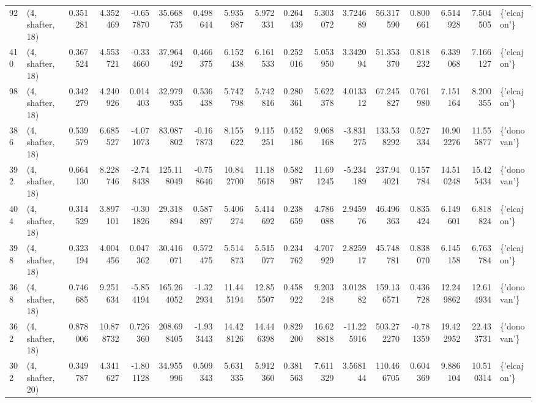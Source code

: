 \begin{tabular}{llrrrrrrrrrrrrrrl}
92  &  (4, shafter, 18) &   0.351281 &   4.352469 &  -0.657870 &    35.668735 &   0.498644 &   5.935987 &   5.972331 &  0.264439 &   5.303072 &   3.724689 &    56.317590 &   0.800661 &   6.514928 &   7.504505 &  \{'elcajon'\} \\
410 &  (4, shafter, 18) &   0.367524 &   4.553721 &  -0.334660 &    37.964492 &   0.466375 &   6.152438 &   6.161533 &  0.252016 &   5.053950 &   3.342094 &    51.353370 &   0.818232 &   6.339068 &   7.166127 &  \{'elcajon'\} \\
98  &  (4, shafter, 18) &   0.342279 &   4.240926 &   0.014403 &    32.979935 &   0.536438 &   5.742798 &   5.742816 &  0.280361 &   5.622378 &   4.013312 &    67.245827 &   0.761980 &   7.151164 &   8.200355 &  \{'elcajon'\} \\
386 &  (4, shafter, 18) &   0.539579 &   6.685527 &  -4.071073 &    83.087802 &  -0.167873 &   8.155622 &   9.115251 &  0.452186 &   9.068168 &  -3.831275 &   133.538292 &   0.527334 &  10.902276 &  11.555877 &  \{'donovan'\} \\
392 &  (4, shafter, 18) &   0.664130 &   8.228746 &  -2.748438 &   125.118049 &  -0.758646 &  10.842700 &  11.185618 &  0.582987 &  11.691245 &  -5.234189 &   237.944021 &   0.157784 &  14.510248 &  15.425434 &  \{'donovan'\} \\
404 &  (4, shafter, 18) &   0.314529 &   3.897101 &  -0.301826 &    29.318894 &   0.587897 &   5.406274 &   5.414692 &  0.238659 &   4.786088 &   2.945976 &    46.496363 &   0.835424 &   6.149601 &   6.818824 &  \{'elcajon'\} \\
398 &  (4, shafter, 18) &   0.323194 &   4.004456 &   0.047362 &    30.416071 &   0.572475 &   5.514873 &   5.515077 &  0.234762 &   4.707929 &   2.825917 &    45.748781 &   0.838070 &   6.145158 &   6.763784 &  \{'elcajon'\} \\
368 &  (4, shafter, 18) &   0.746685 &   9.251634 &  -5.854194 &   165.264052 &  -1.322934 &  11.445194 &  12.855507 &  0.458922 &   9.203248 &   3.012882 &   159.136571 &   0.436728 &  12.249862 &  12.614934 &  \{'donovan'\} \\
362 &  (4, shafter, 18) &   0.878006 &  10.878732 &   0.726360 &   208.698405 &  -1.933443 &  14.428126 &  14.446398 &  0.829200 &  16.628818 & -11.225916 &   503.272270 &  -0.781359 &  19.422952 &  22.433731 &  \{'donovan'\} \\
302 &  (4, shafter, 20) &   0.349787 &   4.341627 &  -1.801128 &    34.955996 &   0.509343 &   5.631335 &   5.912360 &  0.381563 &   7.611329 &   3.568144 &   110.466705 &   0.604369 &   9.886104 &  10.510314 &  \{'elcajon'\} \\

\end{tabular}
